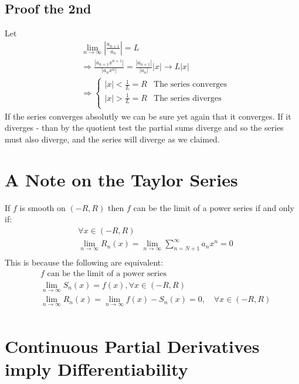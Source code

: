 \documentclass{article}
\begin{document}
	\subsection{Proof the 2nd}
	Let
	\begin{align*}
		&\lim_{n\to\infty}{\left|\frac{a_{n+1}}{a_n}\right|} = L \\
		&\Rightarrow
		\frac{|a_{n+1}x^{n+1}|}{|a_nx^n|} = 
		\frac{|a_{n+1}|}{|a_n|}|x|\to L|x| \\
		&\Rightarrow
		\begin{cases}
		|x|<\frac{1}{L} = R & \text{The series converges} \\
		|x|>\frac{1}{L} = R & \text{The series diverges} \\
		\end{cases}
	\end{align*}
	If the series converges absolutly we can be sure yet again that it converges. 
	If it diverges - than by the quotient test the partial sums 
	diverge and so the series must also diverge, 
	and the series will diverge as we claimed.

	\newpage
	
	\section{A Note on the Taylor Series}
	If $f$ is smooth on $(-R,R)$ then $f$ can be the limit of a power series if and only if:
	\begin{align*}
		&\forall x\in(-R,R) \\
		&\lim_{n\to\infty}{R_n(x) = 
		 \lim_{n\to\infty}{\sum_{n=N+1}^\infty}{a_nx^n} = 0} \\
	\end{align*}
	This is because the following are equivalent:
	\begin{align*}
	    &\text{$f$ can be the limit of a power series} \\
		&\lim_{n\to\infty}{S_n(x)=f(x), \forall x\in(-R,R)} \\
		&\lim_{n\to\infty}{R_n(x)} = 
		\lim_{n\to\infty}{f(x)-S_n(x)=0, \quad \forall x\in(-R,R)} \\
	\end{align*}

	\newpage
	
	\section{Continuous Partial Derivatives imply Differentiability}
\end{document}
